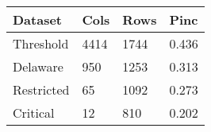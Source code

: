 \begin{tabular}{llll}
  \hline
Dataset & Cols & Rows & Pinc \\ 
  \hline
Threshold & 4414 & 1744 & 0.436 \\ 
  Delaware & 950 & 1253 & 0.313 \\ 
  Restricted & 65 & 1092 & 0.273 \\ 
  Critical & 12 & 810 & 0.202 \\ 
   \hline
\end{tabular}
